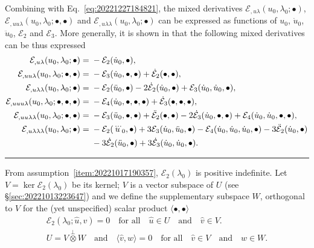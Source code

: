 \documentclass[12pt, final]{scrartcl}
\theoremstyle{definition}
\newcommand{\E}{\mathcal E}
\begin{document}
Combining with Eq.~\eqref{eq:20221227184821}, the mixed derivatives \(\E_{,u\lambda}(u_0, \lambda_0; \bullet)\),
\(\E_{,uu\lambda}(u_0, \lambda_0; \bullet, \bullet)\) and \(\E_{,u\lambda\lambda}(u_0, \lambda_0; \bullet)\) can be expressed as functions of
\(u_0\), \(\dot{u}_0\), \(\ddot{u}_0\), \(\E_2\) and \(\E_3\). More generally, it is shown in
 that the following mixed derivatives can be thus expressed
\begin{align}
  \E_{,u\lambda}(u_0, \lambda_0; \bullet) ={} & -\E_2(\dot{u}_0, \bullet),\\
  \E_{,uu\lambda}(u_0, \lambda_0; \bullet, \bullet) ={} & -\E_3(\dot{u}_0, \bullet, \bullet) + \dot{\E}_2(\bullet, \bullet),\\
  \E_{,u\lambda\lambda}(u_0, \lambda_0; \bullet) ={} &  - \E_2(\ddot{u}_0, \bullet) - 2\dot{\E}_2(\dot{u}_0, \bullet) + \E_3(\dot{u}_0, \dot{u}_0, \bullet),\\
  \E_{,uuu\lambda}(u_0, \lambda_0; \bullet, \bullet, \bullet) ={} & -\E_4(\dot{u}_0, \bullet, \bullet, \bullet) + \dot{\E}_3(\bullet, \bullet, \bullet),\\
  \E_{,uu\lambda\lambda}(u_0, \lambda_0; \bullet, \bullet) ={} & - \E_3(\ddot{u}_0, \bullet, \bullet) + \ddot{\E}_2(\bullet, \bullet) - 2\dot{\E}_3(\dot{u}_0, \bullet, \bullet) + \E_4(\dot{u}_0, \dot{u}_0, \bullet, \bullet),\\
  \notag
  \E_{,u\lambda\lambda\lambda}(u_0, \lambda_0; \bullet) ={} & -\E_2(\dddot{u}_0, \bullet) + 3\E_3(\dot{u}_0, \ddot{u}_0, \bullet) - \E_4(\dot{u}_0, \dot{u}_0, \dot{u}_0, \bullet) - 3\ddot{\E}_2(\dot{u}_0, \bullet)\\
  &-3\dot{\E}_2(\ddot{u}_0, \bullet)+ 3\dot{\E}_3(\dot{u}_0, \dot{u}_0, \bullet).
\end{align}

\medskip
\hrule
\medskip


From assumption~\ref{item:20221017190357}, $\E_2(\lambda_0)$ is positive indefinite. Let $V = \ker \E_2(\lambda_0)$ be
its kernel; $V$ is a vector subspace of $U$ (see \S \ref{sec:20221013223647}) and we define the supplementary subspace
$W$, orthogonal to $V$ for the (yet unspecified) scalar product $\langle \bullet, \bullet \rangle$
\begin{gather}
  \E_2(\lambda_0; \hat{u}, \hat{v}) = 0 \quad \text{for all} \quad \hat{u} \in U \quad \text{and} \quad \hat{v} \in V.\\
  U = V \overset{\perp}{\otimes} W \quad \text{and} \quad \langle \hat{v}, \hat{w} \rangle = 0 \quad \text{for all} \quad \hat{v} \in V \quad \text{and} \quad \hat{w} \in W.
\end{gather}
\end{document}
